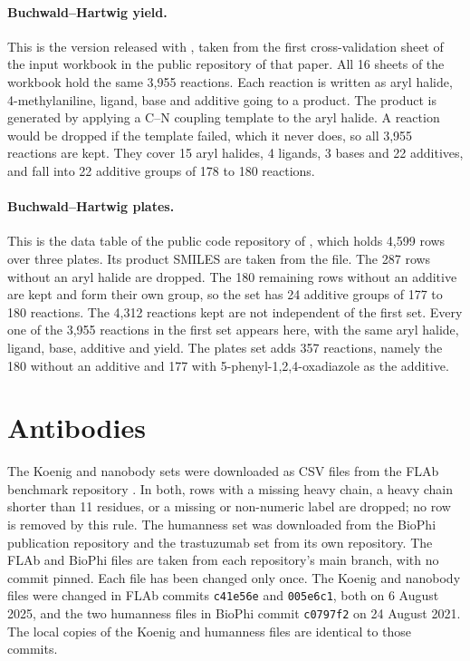 \paragraph{Buchwald--Hartwig yield.} This is the version released with \citet{Schwaller2021a}, taken from the first cross-validation sheet of the input workbook in the public repository of that paper. All 16 sheets of the workbook hold the same 3,955 reactions. Each reaction is written as aryl halide, 4-methylaniline, ligand, base and additive going to a product. The product is generated by applying a C--N coupling template to the aryl halide. A reaction would be dropped if the template failed, which it never does, so all 3,955 reactions are kept. They cover 15 aryl halides, 4 ligands, 3 bases and 22 additives, and fall into 22 additive groups of 178 to 180 reactions.

\paragraph{Buchwald--Hartwig plates.} This is the data table of the public code repository of \citet{Ahneman2018}, which holds 4,599 rows over three plates. Its product SMILES are taken from the file. The 287 rows without an aryl halide are dropped. The 180 remaining rows without an additive are kept and form their own group, so the set has 24 additive groups of 177 to 180 reactions. The 4,312 reactions kept are not independent of the first set. Every one of the 3,955 reactions in the first set appears here, with the same aryl halide, ligand, base, additive and yield. The plates set adds 357 reactions, namely the 180 without an additive and 177 with 5-phenyl-1,2,4-oxadiazole as the additive.

\section{Antibodies}\label{app:datasets:antibodies}

The Koenig and nanobody sets were downloaded as CSV files from the FLAb benchmark repository \citep{Chungyoun2024}. In both, rows with a missing heavy chain, a heavy chain shorter than 11 residues, or a missing or non-numeric label are dropped; no row is removed by this rule. The humanness set was downloaded from the BioPhi publication repository and the trastuzumab set from its own repository. The FLAb and BioPhi files are taken from each repository's main branch, with no commit pinned. Each file has been changed only once. The Koenig and nanobody files were changed in FLAb commits \texttt{c41e56e} and \texttt{005e6c1}, both on 6 August 2025, and the two humanness files in BioPhi commit \texttt{c0797f2} on 24 August 2021. The local copies of the Koenig and humanness files are identical to those commits.

